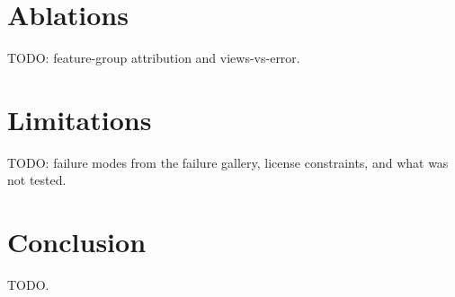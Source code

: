 \documentclass[10pt,twocolumn]{article}
\begin{document}
\section{Ablations}

TODO: feature-group attribution and views-vs-error.

\section{Limitations}
TODO: failure modes from the failure gallery, license constraints, and what was not tested.

\section{Conclusion}
TODO.



\end{document}
